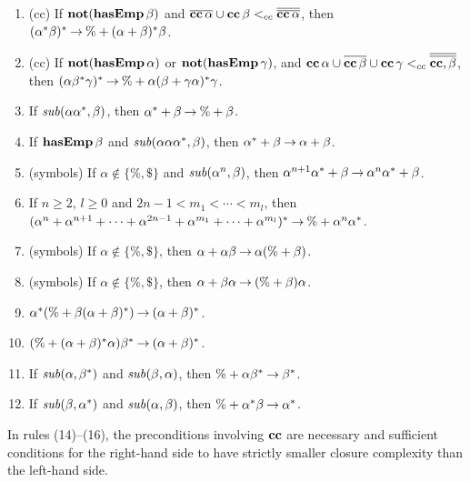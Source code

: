 \begin{enumerate}[\quad(1)]
\item (cc) If $\mathbf{not}(\mathbf{hasEmp}\,\beta)$ and $\overline{\mathbf{cc}\,\alpha} \cup
  \mathbf{cc}\,\beta \mathrel{<_{cc}} \overline{\overline{\mathbf{cc}\,\alpha}}$, then
  $(\alpha^*\beta)^* \mathbin{\to} \% + (\alpha+\beta)^*\beta$.

\item (cc) If $\mathbf{not}(\mathbf{hasEmp}\,\alpha)$ or $\mathbf{not}(\mathbf{hasEmp}\,\gamma)$, and
  $\mathbf{cc}\,\alpha \cup \overline{\mathbf{cc}\,\beta} \cup \mathbf{cc}\,\gamma \mathrel{<_{cc}}
  \overline{\overline{\mathbf{cc},\beta}}$, then $(\alpha\beta^*\gamma)^*
  \mathbin{\to} \% + \alpha(\beta + \gamma\alpha)^*\gamma$.

\item If ${\it sub}(\alpha\alpha^*,\beta)$, then $\alpha^*+\beta \mathbin{\to} \% +
  \beta$.

\item If $\mathbf{hasEmp}\,\beta$ and ${\it sub}(\alpha\alpha\alpha^*, \beta)$,
  then $\alpha^* + \beta \mathbin{\to} \alpha + \beta$.

\item (symbols) If $\alpha\not\in\{\%,\$\}$ and ${\it sub}(\alpha^n, \beta)$, then
  $\alpha^{n+1}\alpha^* + \beta \mathbin{\to} \alpha^n\alpha^* + \beta$.

\item If $n\geq 2$, $l\geq 0$ and $2n - 1 < m_1 < \cdots < m_l$, then
  $(\alpha^n + \alpha^{n+1} + \cdots + \alpha^{2n - 1} + \alpha^{m_1}
  + \cdots + \alpha^{m_l})^* \mathbin{\to} \% + \alpha^n\alpha^*$.

\item (symbols) If $\alpha\not\in\{\%,\$\}$, then $\alpha+\alpha\beta
  \mathbin{\to} \alpha(\%+\beta)$.

\item (symbols) If $\alpha\not\in\{\%,\$\}$, then $\alpha+\beta\alpha
  \mathbin{\to} (\%+\beta)\alpha$.

\item $\alpha^*(\% + \beta(\alpha+\beta)^*) \mathbin{\to} (\alpha+\beta)^*$.

\item $(\% + (\alpha+\beta)^*\alpha)\beta^* \mathbin{\to} (\alpha+\beta)^*$.

\item If ${\it sub}(\alpha, \beta^*)$ and ${\it sub}(\beta, \alpha)$, then
   $\% + \alpha\beta^* \mathbin{\to} \beta^*$.

\item If ${\it sub}(\beta, \alpha^*)$ and ${\it sub}(\alpha, \beta)$, then
   $\% + \alpha^* \beta \mathbin{\to} \alpha^*$.
\end{enumerate}

In rules (14)--(16), the preconditions involving $\mathbf{cc}$ are necessary
and sufficient conditions for the right-hand side to have strictly
smaller closure complexity than the left-hand side.

